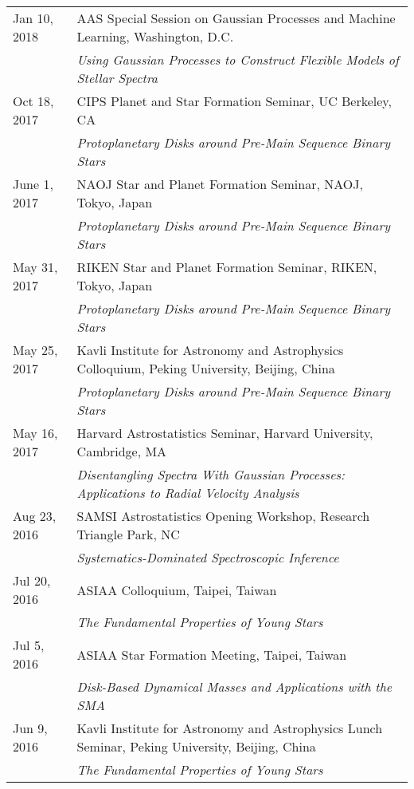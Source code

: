 \documentclass[10pt]{article}
\newcommand{\rowskip}{1.2mm}
\begin{document}
\begin{tabular*}{\textwidth}{@{\hspace{10pt}}p{1.2in}l}
  Jan 10, 2018 & AAS Special Session on Gaussian Processes and Machine Learning, Washington, D.C. \\
  & \emph{Using Gaussian Processes to Construct Flexible Models of Stellar Spectra}\\[\rowskip]
  Oct 18, 2017 & CIPS Planet and Star Formation Seminar, UC Berkeley, CA \\
  & \emph{Protoplanetary Disks around Pre-Main Sequence Binary Stars} \\[\rowskip]
  June 1, 2017 & NAOJ Star and Planet Formation Seminar, NAOJ, Tokyo, Japan \\
  & \emph{Protoplanetary Disks around Pre-Main Sequence Binary Stars} \\[\rowskip]
  May 31, 2017 & RIKEN Star and Planet Formation Seminar, RIKEN, Tokyo, Japan \\
  & \emph{Protoplanetary Disks around Pre-Main Sequence Binary Stars} \\[\rowskip]
  May 25, 2017 & Kavli Institute for Astronomy and Astrophysics Colloquium, Peking University, Beijing, China \\
  & \emph{Protoplanetary Disks around Pre-Main Sequence Binary Stars} \\[\rowskip]
  May 16, 2017 & Harvard Astrostatistics Seminar, Harvard University, Cambridge, MA \\
  & \emph{Disentangling Spectra With Gaussian Processes: Applications to Radial Velocity Analysis} \\[\rowskip]
  Aug 23, 2016 & SAMSI Astrostatistics Opening Workshop, Research Triangle Park, NC \\
  & \emph{Systematics-Dominated Spectroscopic Inference} \\[\rowskip]
  Jul 20, 2016 & ASIAA Colloquium, Taipei, Taiwan \\
  & \emph{The Fundamental Properties of Young Stars} \\[\rowskip]
  Jul 5, 2016 & ASIAA Star Formation Meeting, Taipei, Taiwan \\
  & \emph{Disk-Based Dynamical Masses and Applications with the SMA} \\[\rowskip]
  Jun 9, 2016 & Kavli Institute for Astronomy and Astrophysics Lunch Seminar, Peking University, Beijing, China \\
  & \emph{The Fundamental Properties of Young Stars} \\[\rowskip]

\end{tabular*}
\end{document}
